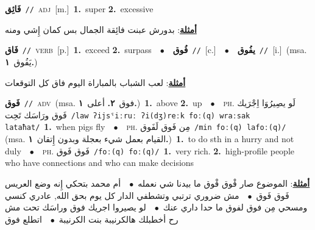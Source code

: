 \documentclass[10pt,a4paper,twoside]{article} %
\begin{document}
\begin{multicols}{2}
{\setlength\topsep{0pt}\textbf{\foreignlanguage{arabic}{فَائِق}}\ {\color{gray}\texttt{//}\color{black}}\ \textsc{adj}\ [m.]\ \textbf{1.}~super  \textbf{2.}~excessive\  \begin{flushright}\color{gray}\foreignlanguage{arabic}{\textbf{\underline{\foreignlanguage{arabic}{أمثلة}}}: بدورش عبنت فائِقة الجمال بس كمان إِشي ومنه}\end{flushright}\color{black}} \vspace{2mm}

{\setlength\topsep{0pt}\textbf{\foreignlanguage{arabic}{فَاق}}\ {\color{gray}\texttt{//}\color{black}}\ \textsc{verb}\ [p.]\ \textbf{1.}~exceed  \textbf{2.}~surpass\ \ $\bullet$\ \ \setlength\topsep{0pt}\textbf{\foreignlanguage{arabic}{فُوق}}\ {\color{gray}\texttt{//}\color{black}}\ [c.]\ \ $\bullet$\ \ \setlength\topsep{0pt}\textbf{\foreignlanguage{arabic}{يفُوق}}\ {\color{gray}\texttt{//}\color{black}}\ [i.]\ \color{gray}(msa. \foreignlanguage{arabic}{يَفُوق}~\foreignlanguage{arabic}{\textbf{١.}})\color{black}\  \begin{flushright}\color{gray}\foreignlanguage{arabic}{\textbf{\underline{\foreignlanguage{arabic}{أمثلة}}}: لعب الشباب بالمباراة اليوم فاق كل التوقعات}\end{flushright}\color{black}} \vspace{2mm}

{\setlength\topsep{0pt}\textbf{\foreignlanguage{arabic}{فَوق}}\ {\color{gray}\texttt{//}\color{black}}\ \textsc{adv}\ \color{gray}(msa. \foreignlanguage{arabic}{فوق}~\foreignlanguage{arabic}{\textbf{٢.}}  \foreignlanguage{arabic}{أعلى}~\foreignlanguage{arabic}{\textbf{١.}})\color{black}\ \textbf{1.}~above  \textbf{2.}~up\ \ $\bullet$\ \ \textsc{ph.} \color{gray} \foreignlanguage{arabic}{لَو يصِيرُوَا اِجْرَيك فَوق ورَاسَك تَحِت}\color{black}\ {\color{gray}\texttt{/{\sffamily law ʔijsˤiːruː ʔi(dʒ)reːk foː(q) wraːsak lataħat}/}\color{black}}\ \textbf{1.}~when pigs fly\ \ $\bullet$\ \ \textsc{ph.} \color{gray} \foreignlanguage{arabic}{مِن فَوق لَفَوق}\color{black}\ {\color{gray}\texttt{/{\sffamily min foː(q) lafoː(q)}/}\color{black}}\ \color{gray} (msa. \foreignlanguage{arabic}{القيام بعمل شيء بعجلة وبدون إِتقان}~\foreignlanguage{arabic}{\textbf{١.}})\color{black}\ \textbf{1.}~to do sth in a hurry and not duly\ \ $\bullet$\ \ \textsc{ph.} \color{gray} \foreignlanguage{arabic}{فَوق فَوق}\color{black}\ {\color{gray}\texttt{/{\sffamily foː(q) foː(q)}/}\color{black}}\ \textbf{1.}~very rich.  \textbf{2.}~high-profile people who have connections and who can make decisions\  \begin{flushright}\color{gray}\foreignlanguage{arabic}{\textbf{\underline{\foreignlanguage{arabic}{أمثلة}}}:  الموضوع صار فْوق فْوق ما بيدنا شي نعمله\ $\bullet$\ \  أم محمد بتحكي إِنه وضع العريس فَوق فَوق\ $\bullet$\ \  مش ضروري ترتبي وتشطفي الدار كل يوم بحق الله, عادري كنسي ومسحي مِن فوق لفوق ما حدا داري عنك\ $\bullet$\ \  لو يصيروا اجريك فوق وراسَك تحت مش رح أخطبلك هالكرنيبة بنت الكرنيبة\ $\bullet$\ \  اتطلع فوق}\end{flushright}\color{black}} \vspace{2mm}


\end{multicols}
\end{document}
